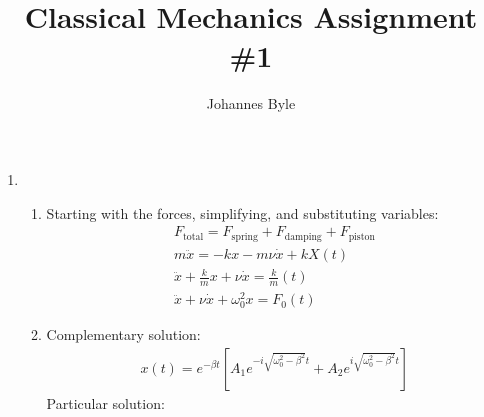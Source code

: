 \documentclass[12pt]{article}
\title{Classical Mechanics Assignment \#1}
\author{Johannes Byle}
\begin{document}
    \maketitle
    \begin{enumerate}
        \item
        \begin{enumerate}
            \item
            Starting with the forces, simplifying, and substituting variables:
            \begin{gather*}
                F_{\text{total}}=F_{\text{spring}}+F_{\text{damping}}+F_{\text{piston}}\\
                m\ddot{x}=-kx-m\nu\dot{x}+kX(t)\\
                \ddot{x}+\frac{k}{m}x+\nu\dot{x}=\frac{k}{m}(t)\\
                \ddot{x}+\nu\dot{x}+\omega_0^2 x=F_0(t)
            \end{gather*}
            \item
            Complementary solution:
            \begin{gather*}
                x(t)=e^{-\beta t}\left[A_1 e^{-i\sqrt{\omega_0^2-\beta^2}t}+A_2 e^{i\sqrt{\omega_0^2-\beta^2}t}\right]
            \end{gather*}
            Particular solution:
            \begin{gather*}

            \end{gather*}
        \end{enumerate}
    \end{enumerate}
\end{document}

